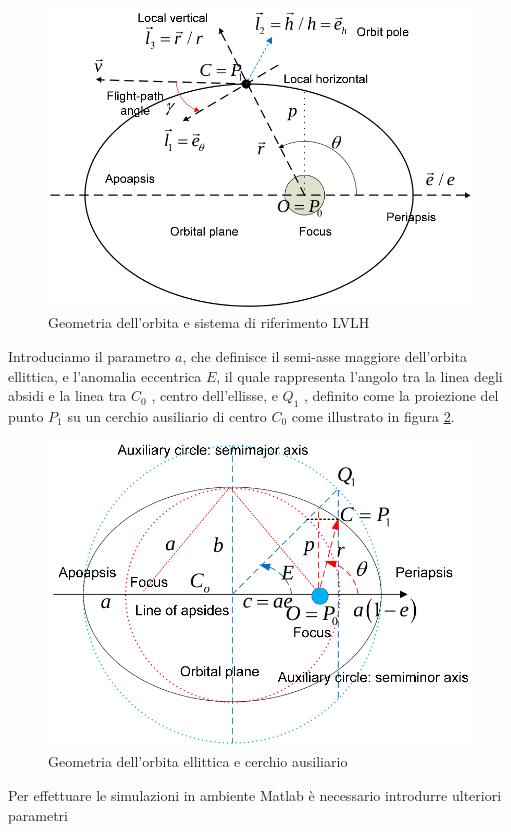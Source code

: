 \begin{figure}[htp]
\begin{center}
  \includegraphics[width=\textwidth]{modelling/orbit_dynamics/image/LVLH.png}
  \caption{Geometria dell'orbita e sistema di riferimento LVLH}
  \label{fig:LVLH}
\end{center}
\end{figure}
Introduciamo il parametro $a$, che definisce il semi-asse maggiore dell'orbita
ellittica, e l'anomalia eccentrica $E$, il quale rappresenta l'angolo tra la
linea degli absidi e la linea tra $C_0$ , centro dell’ellisse, e $Q_1$ ,
definito come la proiezione del punto $P_1$ su un cerchio ausiliario di centro
$C_0$ come illustrato in figura \ref{fig:cerchio_ausiliario}.
\begin{figure}[htp]
\begin{center}
  \includegraphics[width=\textwidth]{modelling/orbit_dynamics/image/cerchio_ausiliario.png}
  \caption{Geometria dell'orbita ellittica e cerchio ausiliario}
  \label{fig:cerchio_ausiliario}
\end{center}
\end{figure}

Per effettuare le simulazioni in ambiente Matlab è necessario introdurre
ulteriori parametri
